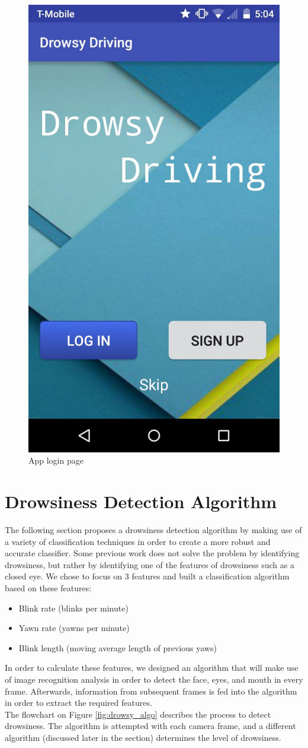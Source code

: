 \documentclass[twocolumn]{article}
\begin{document}
\begin{figure}[H]
\centering
\includegraphics[width=0.6\linewidth]{./logo.jpg}
\caption{App login page }
\label{fig:app}
\end{figure}

\section{Drowsiness Detection Algorithm}
The following section proposes a drowsiness detection algorithm by making use of a variety of classification techniques in order to create a more robust and accurate classifier. Some previous work \cite{pakistan} does not solve the problem by identifying drowsiness, but rather by identifying one of the features of drowsiness such as a closed eye. We chose to focus on 3 features and built a classification algorithm based on these features:
\begin{itemize}
\item Blink rate (blinks per minute)
\item Yawn rate (yawns per minute)
\item Blink length (moving average length of previous yaws)
\end{itemize}
In order to calculate these features, we designed an algorithm that will make use of image recognition analysis in order to detect the face, eyes, and mouth in every frame. Afterwards, information from subsequent frames is fed into the algorithm in order to extract the required features. \\
The flowchart on Figure \ref{fig:drowsy_algo} describes the process to detect drowsiness. The algorithm is attempted with each camera frame, and a different algorithm (discussed later in the section) determines the level of drowsiness. \\
\end{document}
